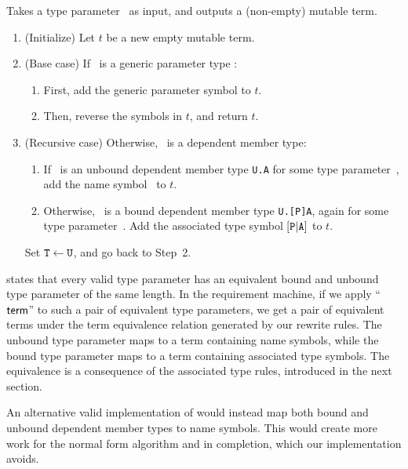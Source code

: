 \documentclass[../generics]{subfiles}
\begin{document}
\begin{algorithm}\label{build term generic}
Takes a type parameter \tT\ as input, and outputs a (non-empty) mutable term.
\begin{enumerate}
\item (Initialize) Let $t$ be a new empty mutable term.
\item (Base case) If \tT\ is a generic parameter type :
\begin{enumerate}
\item First, add the generic parameter symbol  to $t$.
\item Then, reverse the symbols in $t$, and return $t$.
\end{enumerate}
\item (Recursive case) Otherwise, \tT\ is a dependent member type:
\begin{enumerate}
\item If \tT\ is an unbound dependent member type \verb|U.A| for some type parameter~\tU, add the name symbol \nA\ to $t$.
\item Otherwise, \tT\ is a bound dependent member type \verb|U.[P]A|, again for some type parameter~\tU. Add the associated type symbol $[\texttt{P}|\texttt{A}]$ to $t$.
\end{enumerate}
Set $\texttt{T} \leftarrow \texttt{U}$, and go back to Step~2.
\end{enumerate}
\end{algorithm}

 states that every valid type parameter has an equivalent bound and unbound type parameter of the same length. In the requirement machine, if we apply ``$\mathsf{term}$'' to such a pair of equivalent type parameters, we get a pair of equivalent terms under the term equivalence relation generated by our rewrite rules. The unbound type parameter maps to a term containing name symbols, while the bound type parameter maps to a term containing associated type symbols. The equivalence is a consequence of the associated type rules, introduced in the next section.

An alternative valid implementation of  would instead map both bound and unbound dependent member types to name symbols. This would create more work for the normal form algorithm and in completion, which our implementation avoids.
\end{document}
